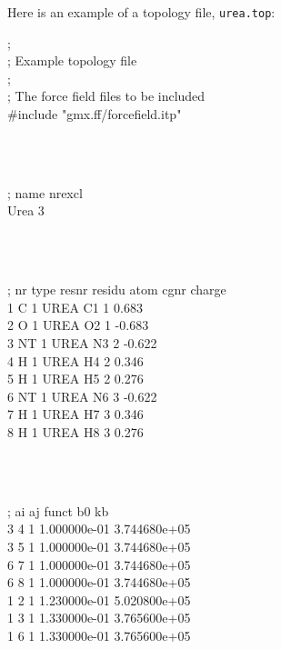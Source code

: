 Here is an example of a topology file, {\tt urea.top}:

\begin{tt}
;\\
;       Example topology file\\
;\\
; The force field files to be included\\
\#include "gmx.ff/forcefield.itp"\\
\end{tt}\\
\begin{tt}
[ moleculetype ]\\
; name  nrexcl\\
Urea         3\\
\end{tt}\\
\begin{tt}
[ atoms ]\\
;   nr    type   resnr  residu    atom    cgnr  charge\\
     1       C       1    UREA      C1       1   0.683\\
     2       O       1    UREA      O2       1  -0.683\\
     3      NT       1    UREA      N3       2  -0.622\\
     4       H       1    UREA      H4       2   0.346\\
     5       H       1    UREA      H5       2   0.276\\
     6      NT       1    UREA      N6       3  -0.622\\
     7       H       1    UREA      H7       3   0.346\\
     8       H       1    UREA      H8       3   0.276\\
\end{tt}\\
\begin{tt}
[ bonds ]\\
;  ai    aj funct           b0           kb\\
    3     4     1 1.000000e-01 3.744680e+05 \\
    3     5     1 1.000000e-01 3.744680e+05 \\
    6     7     1 1.000000e-01 3.744680e+05 \\
    6     8     1 1.000000e-01 3.744680e+05 \\
    1     2     1 1.230000e-01 5.020800e+05 \\
    1     3     1 1.330000e-01 3.765600e+05 \\
    1     6     1 1.330000e-01 3.765600e+05 \\
\end{tt}\\

